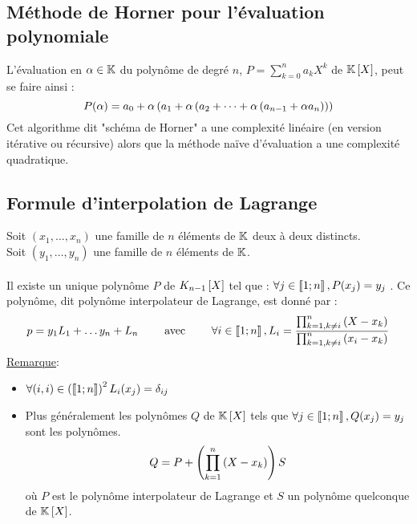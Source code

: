\subsection{Méthode de Horner pour l’évaluation polynomiale}
\begin{defprop}
    L’évaluation en \(\alpha \in \mathbb{K}\) du polynôme de degré \(n\), \(P = \sum_{k = 0}^n a_k X^k\) de \(\mathbb{K} \left[X\right]\), peut se faire ainsi : 
    \[P(\alpha) = a_0 + \alpha \left(a_1 + \alpha\left(a_2 + \dots + \alpha \left( a_{n-1} + \alpha a_n\right)\right)\right)\]
    Cet algorithme dit "schéma de Horner" a une complexité linéaire (en version itérative ou récursive) alors que la méthode naïve d’évaluation a une complexité quadratique.
\end{defprop}
\subsection{Formule d’interpolation de Lagrange}
\begin{defprop}

    Soit \((x_1, \dots, x_n)\) une famille de \(n\) éléments de \(\mathbb{K}\) deux à deux distincts.\\
    Soit \((y_1, \dots, y_n)\) une famille de \(n\) éléments de \(\mathbb{K}\).\\~\\
    Il existe un unique polynôme \(P\) de \(K_{n-1}\left[X\right]\) tel que : \(\forall j \in \left\llbracket1;n\right\rrbracket , P (x_j ) = y_j\) . Ce polynôme, dit polynôme interpolateur de Lagrange, est donné par :
    \[p = y_1 L_1 + \dots y_n + L_n \qquad \text{ avec } \qquad \forall i \in \left\llbracket1;n\right\rrbracket, L_i = \frac{\prod_{k=1,k \neq i}^{n}\left(X - x_k\right)}{\prod_{k=1,k \neq i}^{n}\left(x_i - x_k\right)}\]
    \underline{Remarque}: \\
    \begin{itemize}
        \item \(\forall (i,i) \in \left(\left\llbracket1;n\right\rrbracket\right)^2 L_i(x_j) = \delta_{ij}\)
        \item Plus généralement les polynômes \(Q\) de \(\mathbb{K} \left[X\right]\) tels que \(\forall j \in \left\llbracket1;n\right\rrbracket, Q(x_j) =  y_j\) sont les polynômes.
        \[Q = P + \left(\prod_{k=1}^{n}\left(X-x_k\right)\right)S\]
        où \(P\) est le polynôme interpolateur de Lagrange et \(S\) un polynôme quelconque de \( \mathbb{K} \left[X\right]\).
    \end{itemize}
\end{defprop}
